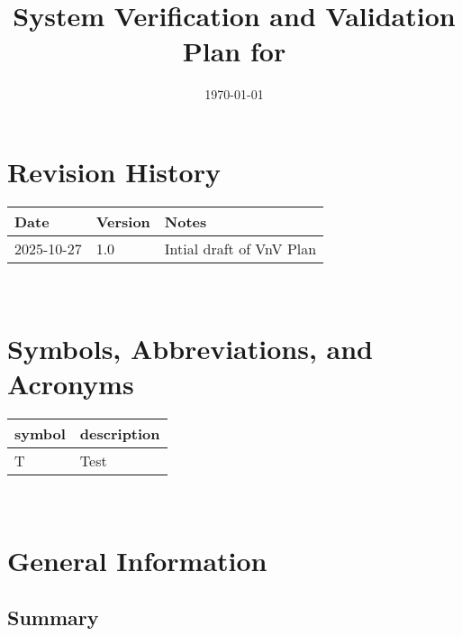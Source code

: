 \documentclass[12pt, titlepage]{article}
\begin{document}
\title{System Verification and Validation Plan for \progname{}} 
\author{\authname}
\date{\today}
	
\maketitle


\section*{Revision History}

\begin{tabularx}{\textwidth}{p{3cm}p{2cm}X}
\toprule {\bf Date} & {\bf Version} & {\bf Notes}\\
\midrule
2025-10-27 & 1.0 & Intial draft of VnV Plan\\
\bottomrule
\end{tabularx}

~\\

\newpage

\tableofcontents

\listoftables


\newpage

\section{Symbols, Abbreviations, and Acronyms}

\renewcommand{\arraystretch}{1.2}
\begin{tabular}{l l} 
  \toprule		
  \textbf{symbol} & \textbf{description}\\
  \midrule 
  T & Test\\
  \bottomrule
\end{tabular}\\



\newpage




\section{General Information}

\subsection{Summary}
\end{document}
